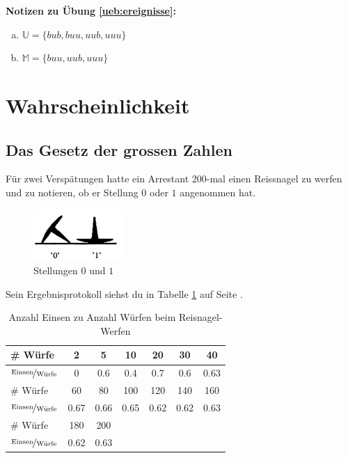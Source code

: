 \documentclass[%
11pt,%
twoside,%
titlepage,%
german,%
headsepline%
]{scrartcl}
\newcommand{\spaltenheight}{\rule{0mm}{3ex}}
\newcommand{\spaltensep}{\\[1ex]}
\newcommand{\concatueb}[1]{ueb:#1}%
\newcommand{\concatlsg}[1]{lsg:#1}%
\newenvironment{lsg}[1]{%
    \par\noindent\textbf{Notizen zu Übung \ref{\concatueb{#1}}:}%
    \label{\concatlsg{#1}}\par
}{%
    \par%
}
\begin{document}
\begin{lsg}{ereignisse}
\begin{enumerate}[a)]
\item $\mathbb{U}=\{bub,buu,uub,uuu\}$
\item $\mathbb{M}=\{buu,uub,uuu\}$
\end{enumerate}
\end{lsg}

\clearpage

\section{Wahrscheinlichkeit}

\subsection{Das Gesetz der grossen Zahlen}

Für zwei Verspätungen hatte ein Arrestant $200$-mal einen Reissnagel zu werfen und zu notieren, ob er Stellung $0$ oder $1$ angenommen hat.
\begin{figure}
\centering
\includegraphics[width=0.3\textwidth]{pictures/reisnagel}
\caption{Stellungen $0$ und $1$}
\end{figure}
Sein Ergebnisprotokoll siehst du in Tabelle \ref{tab:arrest} auf Seite \pageref{tab:arrest}.
\begin{table}
\centering
\begin{tabular}{|l|c|c|c|c|c|c|} \hline
\rowcolor{Gray}\spaltenheight\# Würfe & 2 & 5 & 10 & 20 & 30 & 40\spaltensep \hline
\rowcolor{lightyellow}\spaltenheight$\nicefrac{\text{Einsen}}{\text{Würfe}}$ & 0 & 0.6 & 0.4 & 0.7 & 0.6 & 0.63\spaltensep \hline
\rowcolor{Gray}\spaltenheight\# Würfe & 60 & 80 & 100 & 120 & 140 & 160\spaltensep \hline
\rowcolor{lightyellow}\spaltenheight$\nicefrac{\text{Einsen}}{\text{Würfe}}$ & 0.67& 0.66 & 0.65 & 0.62 & 0.62 & 0.63\spaltensep \hline
\rowcolor{Gray}\spaltenheight\# Würfe & 180 & 200 & & & &\spaltensep \hline
\rowcolor{lightyellow}\spaltenheight$\nicefrac{\text{Einsen}}{\text{Würfe}}$ & 0.62 & 0.63 & & & &\spaltensep \hline
\end{tabular}
\caption{Anzahl Einsen zu Anzahl Würfen beim Reisnagel-Werfen}\label{tab:arrest}
\end{table}
\end{document}
